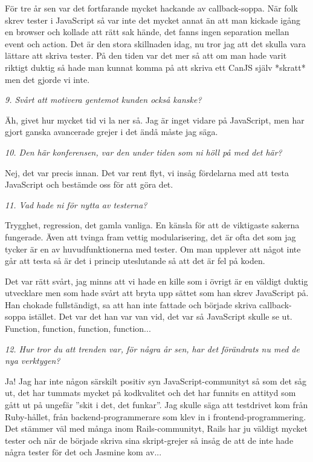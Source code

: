 \documentclass[11pt]{article}
\begin{document}
För tre år sen var det fortfarande mycket hackande av callback-soppa. När folk skrev tester i JavaScript så var inte det mycket annat än att man kickade igång en browser och kollade att rätt sak hände, det fanns ingen separation mellan event och action. Det är den stora skillnaden idag, nu tror jag att det skulla vara lättare att skriva tester. På den tiden var det mer så att om man hade varit riktigt duktig så hade man kunnat komma på att skriva ett CanJS själv *skratt* men det gjorde vi inte.

\emph{9. Svårt att motivera gentemot kunden också kanske?}

Äh, givet hur mycket tid vi la ner så. Jag är inget vidare på JavaScript, men har gjort ganska avancerade grejer i det ändå måste jag säga.

\emph{10. Den här konferensen, var den under tiden som ni höll på med det här?}

Nej, det var precis innan. Det var rent flyt, vi insåg fördelarna med att testa JavaScript och bestämde oss för att göra det.

\emph{11. Vad hade ni för nytta av testerna?}

Trygghet, regression, det gamla vanliga. En känsla för att de viktigaste sakerna fungerade. Även att tvinga fram vettig modularisering, det är ofta det som jag tycker är en av huvudfunktionerna med tester. Om man upplever att något inte går att testa så är det i princip uteslutande så att det är fel på koden.

Det var rätt svårt, jag minns att vi hade en kille som i övrigt är en väldigt duktig utvecklare men som hade svårt att bryta upp sättet som han skrev JavaScript på. Han chokade fullständigt, sa att han inte fattade och började skriva callback-soppa istället. Det var det han var van vid, det var så JavaScript skulle se ut. Function, function, function, function...

\emph{12. Hur tror du att trenden var, för några år sen, har det förändrats nu med de nya verktygen?}

Ja! Jag har inte någon särskilt positiv syn JavaScript-communityt så som det såg ut, det har tummats mycket på kodkvalitet och det har funnits en attityd som gått ut på ungefär ”skit i det, det funkar”. Jag skulle säga att testdrivet kom från Ruby-hållet, från backend-programmerare som klev in i frontend-programmering. Det stämmer väl med många inom Rails-communityt, Rails har ju väldigt mycket tester och när de började skriva sina skript-grejer så insåg de att de inte hade några tester för det och Jasmine kom av...
\end{document}
